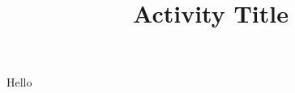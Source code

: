 \documentclass{ximera}
\begin{document}
\title{Activity Title}
\maketitle





\begin{question}
Hello
\end{question}
\end{document}

